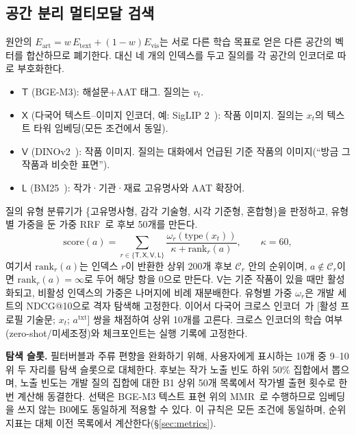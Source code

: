 \documentclass[10pt,twocolumn,letterpaper]{article}
\newcommand{\sT}{\mathsf{T}}
\newcommand{\sX}{\mathsf{X}}
\newcommand{\sV}{\mathsf{V}}
\newcommand{\sL}{\mathsf{L}}
\begin{document}
\subsection{공간 분리 멀티모달 검색}
\label{sec:retrieval}
원안의 $E_{\mathrm{art}}=w\,E_{\mathrm{text}}+(1-w)E_{\mathrm{vis}}$는 서로 다른 학습 목표로 얻은 다른 공간의 벡터를 합산하므로 폐기한다. 대신 네 개의 인덱스를 두고 질의를 각 공간의 인코더로 따로 부호화한다.
\begin{itemize}
\item $\sT$ (BGE-M3): 해설문+AAT 태그. 질의는 $v_t$.
\item $\sX$ (다국어 텍스트–이미지 인코더, 예: SigLIP 2~\cite{tschannen2025siglip2}): 작품 이미지. 질의는 $x_t$의 텍스트 타워 임베딩(모든 조건에서 동일).
\item $\sV$ (DINOv2~\cite{oquab2023dinov2}): 작품 이미지. 질의는 대화에서 언급된 기준 작품의 이미지(``방금 그 작품과 비슷한 표면'').
\item $\sL$ (BM25~\cite{robertson2009bm25}): 작가·기관·재료 고유명사와 AAT 확장어.
\end{itemize}
질의 유형 분류기가 \{고유명사형, 감각 기술형, 시각 기준형, 혼합형\}을 판정하고, 유형별 가중을 둔 가중 RRF~\cite{cormack2009rrf}로 후보 50개를 만든다.
\begin{equation}
\mathrm{score}(a)=\sum_{r\in\{\sT,\sX,\sV,\sL\}}\frac{\omega_r(\mathrm{type}(x_t))}{\kappa+\mathrm{rank}_r(a)},\qquad \kappa=60,
\label{eq:rrf}
\end{equation}
여기서 $\mathrm{rank}_r(a)$는 인덱스 $r$이 반환한 상위 200개 후보 $\mathcal{C}_r$ 안의 순위이며, $a\notin\mathcal{C}_r$이면 $\mathrm{rank}_r(a)=\infty$로 두어 해당 항을 0으로 만든다. $\sV$는 기준 작품이 있을 때만 활성화되고, 비활성 인덱스의 가중은 나머지에 비례 재분배한다. 유형별 가중 $\omega_r$은 개발 세트의 NDCG@10으로 격자 탐색해 고정한다. 이어서 다국어 크로스 인코더~\cite{nogueira2019passage}가 [활성 프로필 기술문; $x_t$; $a^{\mathrm{txt}}$] 쌍을 채점하여 상위 10개를 고른다. 크로스 인코더의 학습 여부(zero-shot/미세조정)와 체크포인트는 실행 기록에 고정한다.

\textbf{탐색 슬롯.} 필터버블과 주류 편향을 완화하기 위해, 사용자에게 표시하는 10개 중 9–10위 두 자리를 탐색 슬롯으로 대체한다. 후보는 작가 노출 빈도 하위 50\% 집합에서 뽑으며, 노출 빈도는 개발 질의 집합에 대한 B1 상위 50개 목록에서 작가별 출현 횟수로 한 번 계산해 동결한다. 선택은 BGE-M3 텍스트 표현 위의 MMR~\cite{carbonell1998mmr}로 수행하므로 임베딩을 쓰지 않는 B0에도 동일하게 적용할 수 있다. 이 규칙은 모든 조건에 동일하며, 순위 지표는 대체 이전 목록에서 계산한다(§\ref{sec:metrics}).
\end{document}
